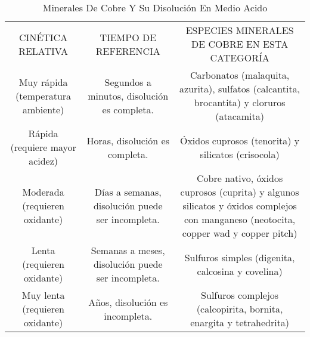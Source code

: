 \begin{table}[H]
\label{tabla3}
\begin{center}
\begin{tabular}{|c|c|c|}
\hline
\multirow{2}{3cm}{CIN\'ETICA RELATIVA} & \multirow{2}{3cm}{TIEMPO DE REFERENCIA}
 &\multirow{2}{6cm}{ESPECIES MINERALES DE COBRE EN ESTA CATEGOR\'IA}\\
 & & \\
\hline 
\multirow{4}{3cm}{Muy r\'apida (temperatura ambiente)} & \multirow{4}{3cm}{Segundos a minutos, disoluci\'on es completa.}
 &\multirow{4}{6cm}{Carbonatos (malaquita, azurita), sulfatos (calcantita, brocantita) y cloruros (atacamita)}\\
 & & \\
 & & \\
 & & \\
\hline 
\multirow{2}{3cm}{R\'apida (requiere mayor acidez)} & \multirow{2}{3cm}{Horas, disoluci\'on es completa.}
 &\multirow{2}{6cm}{\'Oxidos cuprosos (tenorita) y silicatos (crisocola)}\\
 & & \\
\hline 
\multirow{5}{3cm}{Moderada (requieren oxidante)} & \multirow{5}{3cm}{D\'ias a semanas, disoluci\'on puede ser incompleta.}
 &\multirow{5}{6cm}{Cobre nativo, \'oxidos cuprosos (cuprita) y algunos silicatos y \'oxidos complejos con manganeso (neotocita, copper wad y copper pitch)}\\
 & & \\
 & & \\
 & & \\
 & & \\
\hline 
\multirow{3}{3cm}{Lenta (requieren oxidante)} & \multirow{3}{3cm}{Semanas a meses, disoluci\'on puede ser incompleta.}
 &\multirow{3}{6cm}{Sulfuros simples (digenita, calcosina y covelina)}\\
 & & \\
 & & \\
\hline 
\multirow{3}{3cm}{Muy lenta (requieren oxidante)} & \multirow{3}{3cm}{A\~nos, disoluci\'on es incompleta.}
 &\multirow{3}{6cm}{Sulfuros complejos (calcopirita, bornita, enargita y tetrahedrita)}\\
 & & \\
 & & \\
\hline 
\end{tabular}
\end{center}
\caption{Minerales De Cobre Y Su Disoluci\'on En Medio Acido}
\end{table}
  
